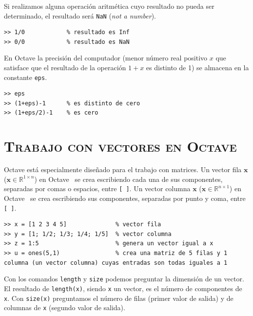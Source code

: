 \documentclass[letter,11pt]{article}
\newcommand\R{\mathbb{R}}
\newcommand\0{\mathbf{0}}
\newcommand{\octave}{{\sc Octave }}
\begin{document}
\medskip
	
	Si realizamos alguna operaci\'on aritm\'etica cuyo resultado no pueda ser determinado,
	el resultado ser\'a \Verb+NaN+ ({\em not a number}).

\medskip

\begin{lstlisting}
>> 1/0            % resultado es Inf
>> 0/0            % resultado es NaN
\end{lstlisting}

\medskip					

	En \octave{} la precisi\'on del computador (menor n\'umero
	real positivo $x$ que satisface que el resultado de la operaci\'on $1+x$ es distinto de
	1) se almacena en la constante \Verb+eps+.

\medskip

\begin{lstlisting}
>> eps
>> (1+eps)-1      % es distinto de cero
>> (1+eps/2)-1    % es cero
\end{lstlisting}

\bigskip

\section{\textsc{Trabajo con vectores en \octave}}

\octave est\'a especialmente dise\~nado para el trabajo con matrices. Un vector fila $\boldsymbol{x}$ ($\boldsymbol{x} \in \R^{1\times n}$) en \octave\, se crea escribiendo cada una de sus componentes, separadas por comas o espacios, entre \Verb+[ ]+. Un vector columna $\boldsymbol{x}$ ($\boldsymbol{x} \in \R^{n\times 1}$) en \octave\, se crea escribiendo sus componentes, separadas por punto y coma, entre \Verb+[ ]+.
	
	\medskip

\begin{lstlisting}
>> x = [1 2 3 4 5]             	% vector fila						
>> y = [1; 1/2; 1/3; 1/4; 1/5] 	% vector columna						
>> z = 1:5                     	% genera un vector igual a x
>> u = ones(5,1)               	% crea una matriz de 5 filas y 1 columna (un vector columna) cuyas entradas son todas iguales a 1
\end{lstlisting}
\newpage

	Con los comandos \Verb+length+ y \Verb+size+ podemos preguntar la dimensi\'on de un vector.
	El resultado de \Verb+length(x)+, siendo \Verb+x+ un vector, es el n\'umero de componentes
	de \Verb+x+. Con \Verb+size(x)+ preguntamos el n\'umero de filas (primer valor de salida)
	y de columnas de \Verb+x+ (segundo valor de salida).
	
\end{document}
